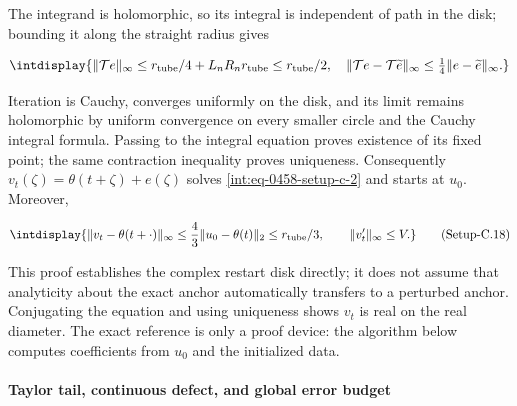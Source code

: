 
The integrand is holomorphic, so its integral is independent of path in the disk; bounding it along the straight radius gives


\begingroup\renewcommand{\theHequation}{intdisplay.941}
\begin{equation*}
\intdisplay{
\|\mathcal Te\|_\infty\le r_{\rm tube}/4+L_nR_nr_{\rm tube}\le r_{\rm tube}/2,
\quad
\|\mathcal Te-\mathcal T\widetilde e\|_\infty
\le\tfrac14\|e-\widetilde e\|_\infty.
}
\end{equation*}
\endgroup


Iteration is Cauchy, converges uniformly on the disk, and its limit remains holomorphic by uniform convergence on every smaller circle and the Cauchy integral formula. Passing to the integral equation proves existence of its fixed point; the same contraction inequality proves uniqueness. Consequently \(v_t(\zeta)=\theta(t+\zeta)+e(\zeta)\) solves \hyperref[int:eq-setup-c-2]{\eqref{int:eq-0458-setup-c-2}} and starts at \(u_0\). Moreover,


\label{int:eq-setup-c-18}
\begingroup\renewcommand{\theHequation}{intdisplay.942}
\begin{equation}
\intdisplay{
\|v_t-\theta(t+\cdot)\|_\infty
\le\frac43\|u_0-\theta(t)\|_2\le r_{\rm tube}/3,
\qquad \|v_t'\|_\infty\le V.
}
\tag{Setup-C.18}
\label{int:eq-0474-setup-c-18}
\end{equation}
\endgroup


This proof establishes the complex restart disk directly; it does not assume that analyticity about the exact anchor automatically transfers to a perturbed anchor. Conjugating the equation and using uniqueness shows \(v_t\) is real on the real diameter. The exact reference is only a proof device: the algorithm below computes coefficients from \(u_0\) and the initialized data.


\paragraph{Taylor tail, continuous defect, and global error budget}
\label{int:setup-core-5}
\mbox{}\par\smallskip


